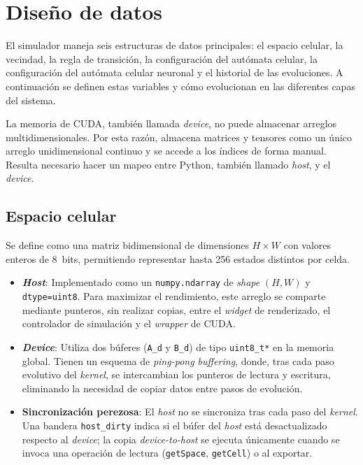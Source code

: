 \section{Diseño de datos}

El simulador maneja seis estructuras de datos principales: el espacio celular, la vecindad, la regla de transición, la configuración del autómata celular, la configuración del autómata celular neuronal y el historial de las evoluciones. A continuación se definen estas variables y cómo evolucionan en las diferentes capas del sistema.

La memoria de CUDA, también llamada \textit{device}, no puede almacenar arreglos multidimensionales. Por esta razón, almacena matrices y tensores como un único arreglo unidimensional continuo y se accede a los índices de forma manual. Resulta necesario hacer un mapeo entre Python, también llamado \textit{host}, y el \textit{device}.

\subsection{Espacio celular}

Se define como una matriz bidimensional de dimensiones $H \times W$ con valores enteros de 8~bits, permitiendo representar hasta 256 estados distintos por celda.

\begin{itemize}
	\item \textbf{\textit{Host}}: Implementado como un \texttt{numpy.ndarray} de \textit{shape} $(H, W)$ y \texttt{dtype=uint8}. Para maximizar el rendimiento, este arreglo se comparte mediante punteros, sin realizar copias, entre el \textit{widget} de renderizado, el controlador de simulación y el \textit{wrapper} de CUDA.
	
	\item \textbf{\textit{Device}}: Utiliza dos búferes (\texttt{A\_d} y \texttt{B\_d}) de tipo \texttt{uint8\_t*} en la memoria global. Tienen un esquema de \textit{ping-pong buffering}, donde, tras cada paso evolutivo del \textit{kernel}, se intercambian los punteros de lectura y escritura, eliminando la necesidad de copiar datos entre pasos de evolución.
	
	\item \textbf{Sincronización perezosa}: El \textit{host} no se sincroniza tras cada paso del \textit{kernel}. Una bandera \texttt{host\_dirty} indica si el búfer del \textit{host} está desactualizado respecto al \textit{device}; la copia \textit{device-to-host} se ejecuta únicamente cuando se invoca una operación de lectura (\texttt{getSpace}, \texttt{getCell}) o al exportar.
\end{itemize}

